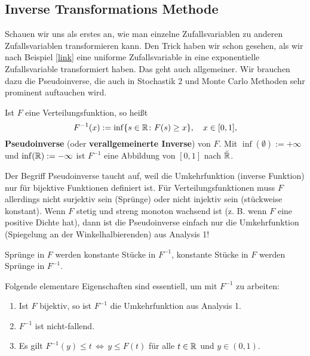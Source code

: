 \subsection{Inverse Transformations Methode}\label{sectrafo}
Schauen wir uns als erstes an, wie man einzelne Zufallsvariablen zu anderen Zufallsvariablen transformieren kann. Den Trick haben wir schon gesehen, als wir nach Beispiel \ref{link} eine uniforme Zufallsvariable in eine exponentielle Zufallsvariable transformiert haben. Das geht auch allgemeiner. Wir brauchen dazu die Pseudoinverse, die auch in Stochastik 2 und Monte Carlo Methoden sehr prominent auftauchen wird.
\begin{deff}
	Ist $F$ eine Verteilungsfunktion, so heißt $$F^{-1}(x) := \inf\{ s \in \mathbb{R} \colon F(s) \geq x \}, \quad x \in [0,1],$$ \textbf{Pseudoinverse} (oder \textbf{verallgemeinerte Inverse}) von $F$. Mit $\inf(\emptyset) := +\infty$ und $\inf(\mathbb{R}) := -\infty$ ist $F^{-1}$ eine Abbildung von $[0,1]$ nach $\bar{\mathbb{R}}$.
\end{deff}
Der Begriff Pseudoinverse taucht auf, weil die Umkehrfunktion (inverse Funktion) nur f\"ur bijektive Funktionen definiert ist. F\"ur Verteilungsfunktionen muss $F$ allerdings nicht surjektiv sein (Spr\"unge) oder nicht injektiv sein (st\"uckweise konstant). Wenn $F$ stetig und streng monoton wachsend ist (z. B. wenn $F$ eine positive Dichte hat), dann ist die Pseudoinverse einfach nur die Umkehrfunktion (Spiegelung an der Winkelhalbierenden) aus Analysis 1!
\begin{bem1}
	 Sprünge in $F$ werden konstante Stücke in $F^{-1}$, konstante Stücke in $F$ werden Sprünge in $F^{-1}$.
\end{bem1}
Folgende elementare Eigenschaften sind essentiell, um mit $F^{-1}$ zu arbeiten:
\begin{lemma}\label{PI}  \abs 

	\begin{enumerate}[label=(\roman*)]
		\item Ist $F$ bijektiv, so ist $F^{-1}$ die Umkehrfunktion aus Analysis 1.
		\item $F^{-1}$ ist nicht-fallend.
		\item Es gilt $F^{-1}(y) \leq t \, \Leftrightarrow \, y \leq F(t)$ f\"ur alle $t \in \mathbb{R}$ und $y \in (0,1)$.
	\end{enumerate}
\end{lemma}

